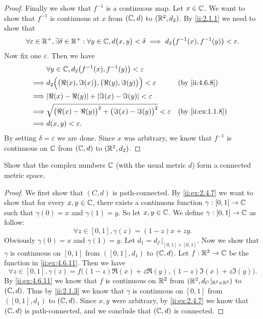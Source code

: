\begin{proof}
  Finally we show that \(f^{-1}\) is a continuous map.
  Let \(x \in \mathbb{C}\).
  We want to show that \(f^{-1}\) is continuous at \(x\) from \((\mathbb{C}, d)\) to \((\mathbb{R}^2, d_2)\).
  By \cref{ii:2.1.1} we need to show that
  \[
    \forall \varepsilon \in \mathbb{R}^+, \exists \delta \in \mathbb{R}^+ : \forall y \in \mathbb{C}, d\big(x, y\big) < \delta \implies d_2\big(f^{-1}(x), f^{-1}(y)\big) < \varepsilon.
  \]
  Now fix one \(\varepsilon\).
  Then we have
  \begin{align*}
             & \forall y \in \C, d_2\big(f^{-1}(x), f^{-1}(y)\big) < \varepsilon                                    \\
    \implies & d_2\Big(\big(\Re(x), \Im(x)\big), \big(\Re(y), \Im(y)\big)\Big) < \varepsilon  &  & \by{ii:4.6.8}    \\
    \implies & \abs{\Re(x) - \Re(y)} + \abs{\Im(x) - \Im(y)} < \varepsilon                                          \\
    \implies & \sqrt{\big(\Re(x) - \Re(y)\big)^2 + \big(\Im(x) - \Im(y)\big)^2} < \varepsilon &  & \by{ii:ex:1.1.8} \\
    \implies & d(x, y) < \varepsilon.
  \end{align*}
  By setting \(\delta = \varepsilon\) we are done.
  Since \(x\) was arbitrary, we know that \(f^{-1}\) is continuous on \(\mathbb{C}\) from \((\mathbb{C}, d)\) to \((\mathbb{R}^2, d_2)\).
\end{proof}

\begin{ex}\label{ii:ex:4.6.12}
  Show that the complex numbers \(\mathbb{C}\) (with the usual metric \(d\)) form a connected metric space.
\end{ex}

\begin{proof}
  We first show that \((C, d)\) is path-connected.
  By \cref{ii:ex:2.4.7} we want to show that for every \(x, y \in \mathbb{C}\), there exists a continuous function \(\gamma : [0, 1] \to \mathbb{C}\) such that \(\gamma(0) = x\) and \(\gamma(1) = y\).
  So let \(x, y \in \mathbb{C}\).
  We define \(\gamma : [0, 1] \to \mathbb{C}\) as follow:
  \[
    \forall z \in [0, 1], \gamma(z) = (1 - z)x + zy.
  \]
  Obviously \(\gamma(0) = x\) and \(\gamma(1) = y\).
  Let \(d_1 = d_{l^1}|_{[0, 1] \times [0, 1]}\).
  Now we show that \(\gamma\) is continuous on \([0, 1]\) from \(([0, 1], d_1)\) to \((\mathbb{C}, d)\).
  Let \(f : \mathbb{R}^2 \to \mathbb{C}\) be the function in \cref{ii:ex:4.6.11}.
  Then we have
  \[
    \forall z \in [0, 1], \gamma(z) = f\big((1 - z) \Re(x) + z \Re(y), (1 - z) \Im(x) + z \Im(y)\big).
  \]
  By \cref{ii:ex:4.6.11} we know that \(f\) is continuous on \(\mathbb{R}^2\) from \((\mathbb{R}^2, d_{l^1}|_{\mathbb{R}^2 \times \mathbb{R}^2})\) to \((\mathbb{C}, d)\).
  Thus by \cref{ii:2.1.3} we know that \(\gamma\) is continuous on \([0, 1]\) from \(([0, 1], d_1)\) to \((\mathbb{C}, d)\).
  Since \(x, y\) were arbitrary, by \cref{ii:ex:2.4.7} we know that \((\mathbb{C}, d)\) is path-connected, and we conclude that \((\mathbb{C}, d)\) is connected.
\end{proof}

